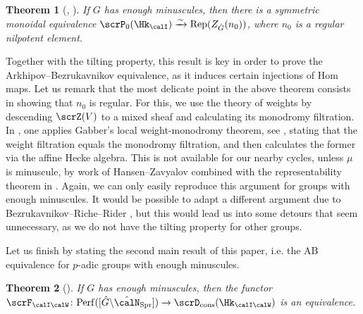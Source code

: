 \documentclass[10pt, reqno]{amsart}
\theoremstyle{plain}
\newtheorem{theorem}{Theorem}[section]
\theoremstyle{definition}
\numberwithin{equation}{section}
\begin{document}
	\begin{theorem}[, ]
		If $G$ has enough minuscules, then there is a symmetric monoidal equivalence $\scrP_0(\Hk_{\calI}) \xrightarrow{\sim} \mathrm{Rep}(Z_{\hat{G}}(n_0))$, where $n_0$ is a regular nilpotent element.
	\end{theorem}
	
	Together with the tilting property, this result is key in order to prove the Arkhipov--Bezrukavnikov equivalence, as it induces certain injections of $\mathrm{Hom}$ maps. Let us remark that the most delicate point in the above theorem consists in showing that $n_0$ is regular. For this, we use the theory of weights by descending $\scrZ(V)$ to a mixed sheaf and calculating its monodromy filtration. In \cite{AB09}, one applies Gabber's local weight-monodromy theorem, see \cite{BB93}, stating that the weight filtration equals the monodromy filtration, and then calculates the former via the affine Hecke algebra. This is not available for our nearby cycles, unless $\mu$ is minuscule, by work of Hansen--Zavyalov \cite{HZ23} combined with the representability theorem in \cite{AGLR22}. Again, we can only easily reproduce this argument for groups with enough minuscules. It would be possible to adapt a different argument due to Bezrukavnikov--Riche--Rider \cite{BRR20}, but this would lead us into some detours that seem unnecessary, as we do not have the tilting property for other groups.
	
	Let us finish by stating the second main result of this paper, i.e. the AB equivalence for $p$-adic groups with enough minuscules. 
	
	\begin{theorem}[]
		If $G$ has enough minuscules, then the functor $\scrF_{\calI\calW}\colon \mathrm{Perf}([\hat{G}\backslash \hat{\calN}_{\mathrm{Spr}}])\to \scrD_{\mathrm{cons}}(\Hk_{\calI\calW})$ is an equivalence.
	\end{theorem}
	
\end{document}
